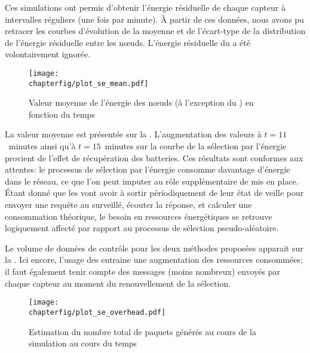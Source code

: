 Ces simulations ont permis d'obtenir l'énergie résiduelle de chaque capteur à intervalles réguliers (une fois par minute).
À partir de ces données, nous avons pu retracer les courbes d'évolution de la moyenne et de l'écart-type de la distribution de l'énergie résiduelle entre les nœuds.
L'énergie résiduelle du \ch a été volontairement ignorée.
\begin{figure}[!b]
    \centering
    \texttt{[image: \\chapterfig/plot\_se\_mean.pdf]}
    \caption{Valeur moyenne de l'énergie des nœuds (à l'exception du \ch) en fonction du temps}\label{se:fig:mean}
\end{figure}
La valeur moyenne est présentée sur la .
L'augmentation des valeurs à $t=11$~minutes ainsi qu'à $t=15$~minutes sur la courbe de la sélection par l'énergie provient de l'effet de récupération des batteries.
Ces résultats sont conformes aux attentes: le processus de sélection par l'énergie consomme davantage d'énergie dans le réseau, ce que l'on peut imputer au rôle supplémentaire de \vn mis en place.
Étant donné que les \vns vont avoir à sortir périodiquement de leur état de veille pour envoyer une requête au \cn surveillé, écouter la réponse, et calculer une consommation théorique, le besoin en ressources énergétiques se retrouve logiquement affecté par rapport au processus de sélection pseudo-aléatoire.

Le volume de données de contrôle pour les deux méthodes proposées apparait sur la .
Ici encore, l'usage des \vns entraine une augmentation des ressources consommées; il faut également tenir compte des messages (moins nombreux) envoyés par chaque capteur au moment du renouvellement de la sélection.
\begin{figure}[!ht]
    \centering
    \texttt{[image: \\chapterfig/plot\_se\_overhead.pdf]}
    \caption{Estimation du nombre total de paquets générés au cours de la simulation au cours du temps}\label{se:fig:overhead}
\end{figure}

